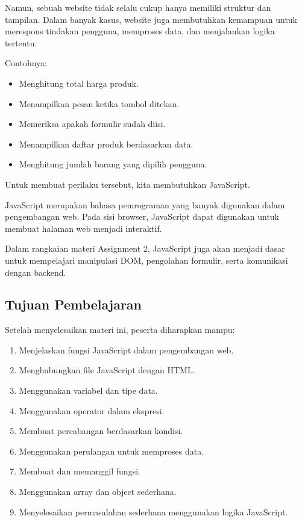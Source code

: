 \documentclass[12pt,a4paper]{article}
\begin{document}
Namun, sebuah website tidak selalu cukup hanya
memiliki struktur dan tampilan. Dalam banyak kasus,
website juga membutuhkan kemampuan untuk merespons
tindakan pengguna, memproses data, dan menjalankan
logika tertentu.

Contohnya:

\begin{itemize}
    \item Menghitung total harga produk.
    \item Menampilkan pesan ketika tombol ditekan.
    \item Memeriksa apakah formulir sudah diisi.
    \item Menampilkan daftar produk berdasarkan data.
    \item Menghitung jumlah barang yang dipilih pengguna.
\end{itemize}

Untuk membuat perilaku tersebut, kita membutuhkan
JavaScript.

JavaScript merupakan bahasa pemrograman yang banyak
digunakan dalam pengembangan web. Pada sisi browser,
JavaScript dapat digunakan untuk membuat halaman web
menjadi interaktif.

Dalam rangkaian materi Assignment 2, JavaScript juga
akan menjadi dasar untuk mempelajari manipulasi DOM,
pengolahan formulir, serta komunikasi dengan backend.

\subsection{Tujuan Pembelajaran}

Setelah menyelesaikan materi ini, peserta diharapkan
mampu:

\begin{enumerate}
    \item Menjelaskan fungsi JavaScript dalam pengembangan web.
    \item Menghubungkan file JavaScript dengan HTML.
    \item Menggunakan variabel dan tipe data.
    \item Menggunakan operator dalam ekspresi.
    \item Membuat percabangan berdasarkan kondisi.
    \item Menggunakan perulangan untuk memproses data.
    \item Membuat dan memanggil fungsi.
    \item Menggunakan array dan object sederhana.
    \item Menyelesaikan permasalahan sederhana menggunakan
    logika JavaScript.
\end{enumerate}
\end{document}
